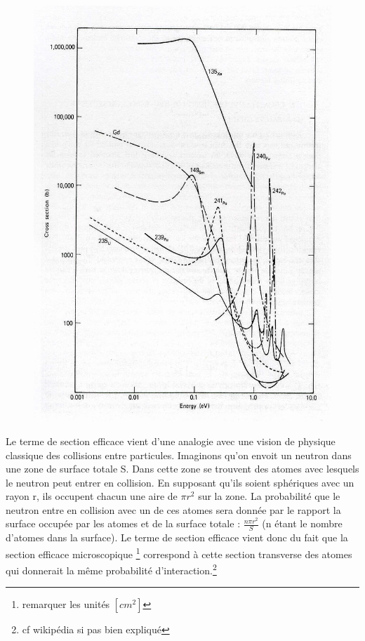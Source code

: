 	\begin{figure}
	\vspace{-8mm}
	\includegraphics[scale=0.13]{ch1/image3.png}
	\end{figure}
	
Le terme de section efficace vient d'une analogie avec une vision de physique classique des collisions entre particules.
Imaginons qu'on envoit un neutron dans une zone de surface totale S. Dans cette zone se trouvent des atomes
avec lesquels le neutron peut entrer en collision. En supposant qu'ils soient sphériques avec un rayon r, ils occupent
chacun une aire de $\pi r^2$ sur la zone. La probabilité que le neutron entre en collision avec un de ces atomes sera
donnée par le rapport la surface occupée par les atomes et de la surface totale : $\frac{n \pi r^2}{S}$ (n étant le
nombre d'atomes dans la surface). Le terme de section efficace vient donc du fait que la section efficace microscopique
\footnote{remarquer les unités $[cm^{2}]$} correspond à cette section transverse des atomes qui donnerait la même probabilité
d'interaction.\footnote{cf wikipédia si pas bien expliqué}\\

